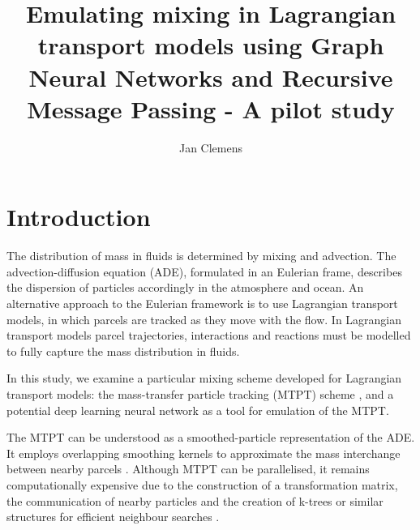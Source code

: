 \documentclass[twocolumn, switch]{article} %
\title{Emulating mixing in Lagrangian transport models using Graph Neural Networks and Recursive Message Passing - A pilot study}
\author[1\thanks{\tt{asmith@college.edu}}]{Jan Clemens\orcidA{}}
\affil[1]{Instititue of Climate and Energy Systems 4 - Stratosphere, Research Centre Jülich}
\begin{document}
\twocolumn[ %
  \begin{@twocolumnfalse} %
  
\maketitle

\begin{abstract}

\end{abstract}
\vspace{0.35cm}

  \end{@twocolumnfalse} %
] %




\section{Introduction}
The distribution of mass in fluids is determined by mixing and advection. The advection-diffusion equation (ADE), formulated in an Eulerian frame, describes the dispersion of particles accordingly in the atmosphere and ocean. An alternative approach to the Eulerian framework is to use Lagrangian transport models, in which parcels are tracked as they move with the flow. In Lagrangian transport models parcel trajectories, interactions and reactions must be modelled to fully capture the mass distribution in fluids.

In this study, we examine a particular mixing scheme developed for Lagrangian transport models: the mass-transfer particle tracking (MTPT) scheme \citep[][]{Benson2008,Benson2016, Benson2019}, and a potential deep learning neural network as a tool for emulation of the MTPT.

The MTPT can be understood as a smoothed-particle representation of the ADE. It employs overlapping smoothing kernels to approximate the mass interchange between nearby parcels \citep{Pankavich2025}.  Although MTPT can be parallelised, it remains computationally expensive due to the construction of a transformation matrix, the communication of nearby particles and the creation of k-trees or similar structures for efficient neighbour searches \citep{Benson2024}. 
\end{document}
